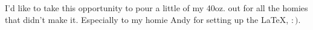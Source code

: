\begin{acknowledgements} 
I'd like to take this opportunity to pour a little of my 40oz. out for all
the homies that didn't make it.
Especially to my homie Andy for setting up the \LaTeX,
 $:)$.
\end{acknowledgements}
